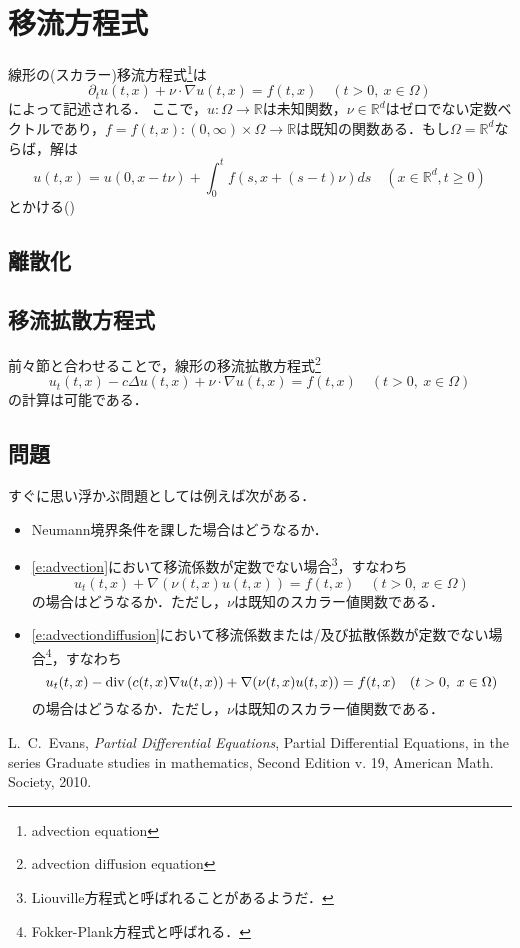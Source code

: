 \section{移流方程式}
線形の(スカラー)移流方程式\footnote{advection equation}は
\begin{equation}
\label{e:advection}
\partial_t u(t,x)+\nu\cdot\nabla u(t,x)=f(t,x)\quad(t>0,\ x\in\Omega)
\end{equation}
によって記述される．
ここで，$u:\Omega\to\mathbb{R}$は未知関数，$\nu\in\mathbb{R}^d$はゼロでない定数ベクトルであり，$f=f(t,x):(0,\infty)\times\Omega\to\mathbb{R}$は既知の関数ある．もし$\Omega=\mathbb{R}^d$ならば，解は
$$
u(t,x)=u(0,x-t\nu)+\int_0^t f(s,x+(s-t)\nu)ds\quad(x\in\mathbb{R}^d,t\ge0)
$$
とかける(\cite[Section 2.1.2]{evans})

\subsection{離散化}




\subsection{移流拡散方程式}
前々節と合わせることで，線形の移流拡散方程式\footnote{advection diffusion equation}
\begin{equation}
\label{e:advectiondiffusion}
u_t(t,x)-c\Delta u(t,x)+\nu\cdot\nabla u(t,x)=f(t,x)\quad(t>0,\ x\in\Omega)
\end{equation}
の計算は可能である．

\subsection{問題}
すぐに思い浮かぶ問題としては例えば次がある．
\begin{itemize}
\item Neumann境界条件を課した場合はどうなるか．
\item \eqref{e:advection}において移流係数が定数でない場合\footnote{Liouville方程式と呼ばれることがあるようだ．}，すなわち
$$
u_t(t,x)+\nabla(\nu(t,x) u(t,x))=f(t,x)\quad(t>0,\ x\in\Omega)
$$
の場合はどうなるか．ただし，$\nu$は既知のスカラー値関数である．
\item \eqref{e:advectiondiffusion}において移流係数または/及び拡散係数が定数でない場合\footnote{Fokker-Plank方程式と呼ばれる．}，すなわち
$$
u_t(t,x)-\operatorname{\mathrm{div}\,}(c(t,x)\nabla u(t,x))+\nabla(\nu(t,x)u(t,x))=f(t,x)\quad(t>0,\ x\in\Omega)
$$
の場合はどうなるか．ただし，$\nu$は既知のスカラー値関数である．
\end{itemize}




\begin{thebibliography}{99}
   L.~C.~Evans, \emph{Partial Differential Equations}, Partial Differential Equations, in the series Graduate studies in mathematics,
Second Edition v. 19, American Math. Society, 2010.
  \end{thebibliography}